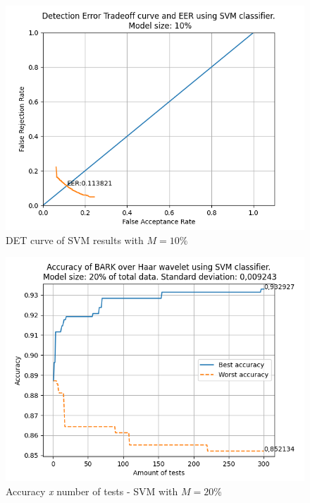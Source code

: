 \begin{figure}[H]
\centering
\includegraphics[scale=.6]{images/results/det/DET_SVM_10}
\caption{DET curve of SVM results with $M=10\%$}
\label{fig:detsvm10}
\end{figure}
\begin{figure}[H]
\centering
\includegraphics[scale=.6]{images/results/confusionMatrices/classifier_SVM_20.png}
\caption{Accuracy \textit{x} number of tests - SVM with $M=20\%$}
\label{fig:classifiersvm20}
\end{figure}
